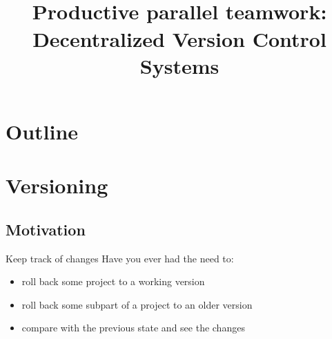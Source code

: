 \documentclass[presentation]{beamer}
\title[02 - Teamwork]{\small{} \\
\normalsize{Productive parallel teamwork: Decentralized Version Control Systems}}
\begin{document}


\newcommand{\codefile}[3]{
	\begin{block}{\texttt{#1}}
		\inputminted[fontsize=#2,linenos=true,breaklines=true]{#3}{#1}
	\end{block}
}
\frame[label=coverpage]{\titlepage}

\section*{Outline}

\frame{\tableofcontents}


\section{Versioning}

\subsection{Motivation}

\begin{frame}{Keep track of changes}
    Have you ever had the need to:
    \begin{itemize}
        \item roll back some project to a working version
        \item roll back some subpart of a project to an older version
        \item compare with the previous state and see the changes
    \end{itemize}
\end{frame}
\end{document}
